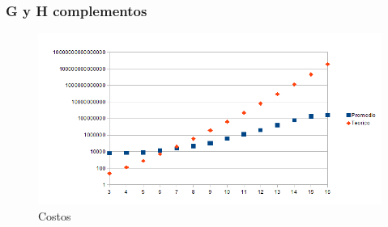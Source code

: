 \subsubsection{G y H complementos}

\begin{figure}[H]
	\centering
	\includegraphics[scale=0.8]{exacto-tiempos-H-complemento.png}
\caption{Costos}
\end{figure}